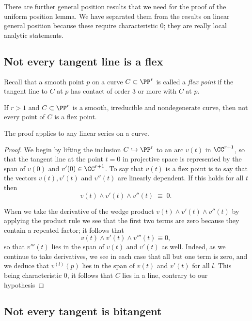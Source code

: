 There are  further general position results that we need for the proof of the uniform position lemma.  We have separated
them from the results on linear general position because these require characteristic 0; they are really local analytic
statements.


\subsection{Not every tangent line is a flex}\label{isolated tangents and bitangents}

Recall that a smooth point $p$ on a curve $C \subset \PP^r$ is called a \emph{flex point} if the tangent line to $C$ at  $p$ has contact of order 3 or more with $C$ at $p$.

\begin{lemma}\label{finite inflections}
If $r>1$ and $C \subset \PP^r$ is a smooth, irreducible and nondegenerate curve, then not every point of $C$ is a flex point.
\end{lemma}

The proof applies to any linear series on a curve.

\begin{proof}
We begin by lifting the inclusion $C \hookrightarrow \PP^r$ to an arc $v (t)$ in $\CC^{r+1}$, so that the tangent line at the point $t=0$ in projective space
is represented by the span of $v(0)$ and $v'(0) \in \CC^{r+1}$. To say that $v(t)$ is a flex point is to say that the  vectors $v(t), v'(t)$ and $v''(t)$ are linearly dependent. If this holds for all $t$ then
$$
v(t) \wedge  v'(t) \wedge v''(t) \; \equiv \; 0.
$$

When we take the derivative of the wedge product $v(t) \wedge v'(t) \wedge v''(t)$ by applying the product rule we see that the first two terms are zero because they contain a repeated factor; it follows that
$$
v(t) \wedge  v'(t) \wedge v'''(t) \equiv 0,
$$
so that $v'''(t)$ lies in the span of $v(t)$ and $v'(t)$ as well. Indeed, as we continue to take derivatives, we see in each case that all but one term is zero, and we deduce that $v^{(l)}(p)$ lies in the span of $v(t)$ and $v'(t)$ for all $l$. This being characteristic 0, it follows that $C$ lies in a line, contrary to our hypothesis
\end{proof}


 \subsection{Not every tangent is bitangent}
 

